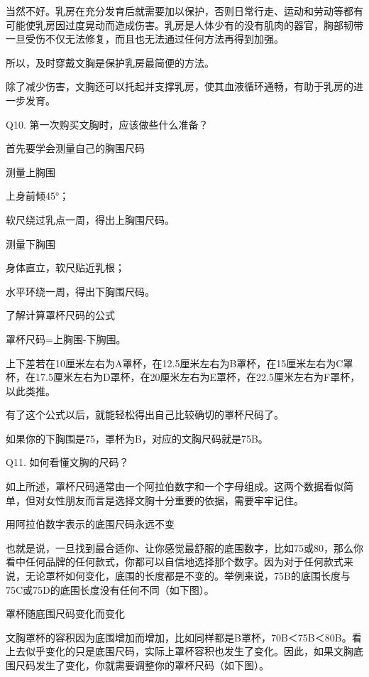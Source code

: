 \documentclass[12pt,UTF8]{ctexbook}
\begin{document}
当然不好。乳房在充分发育后就需要加以保护，否则日常行走、运动和劳动等都有可能使乳房因过度晃动而造成伤害。乳房是人体少有的没有肌肉的器官，胸部韧带一旦受伤不仅无法修复，而且也无法通过任何方法再得到加强。

所以，及时穿戴文胸是保护乳房最简便的方法。

除了减少伤害，文胸还可以托起并支撑乳房，使其血液循环通畅，有助于乳房的进一步发育。





Q10. 第一次购买文胸时，应该做些什么准备？


首先要学会测量自己的胸围尺码


测量上胸围

上身前倾45°；

软尺绕过乳点一周，得出上胸围尺码。


测量下胸围

身体直立，软尺贴近乳根；

水平环绕一周，得出下胸围尺码。

了解计算罩杯尺码的公式

罩杯尺码=上胸围-下胸围。

上下差若在10厘米左右为A罩杯，在12.5厘米左右为B罩杯，在15厘米左右为C罩杯，在17.5厘米左右为D罩杯，在20厘米左右为E罩杯，在22.5厘米左右为F罩杯，以此类推。

有了这个公式以后，就能轻松得出自己比较确切的罩杯尺码了。

如果你的下胸围是75，罩杯为B，对应的文胸尺码就是75B。





Q11. 如何看懂文胸的尺码？


如上所述，罩杯尺码通常由一个阿拉伯数字和一个字母组成。这两个数据看似简单，但对女性朋友而言是选择文胸十分重要的依据，需要牢牢记住。

用阿拉伯数字表示的底围尺码永远不变

也就是说，一旦找到最合适你、让你感觉最舒服的底围数字，比如75或80，那么你看中任何品牌的任何款式，你都可以自信地选择那个数字。因为对于任何款式来说，无论罩杯如何变化，底围的长度都是不变的。举例来说，75B的底围长度与75C或75D的底围长度没有任何不同（如下图）。



罩杯随底围尺码变化而变化

文胸罩杯的容积因为底围增加而增加，比如同样都是B罩杯，70B＜75B＜80B。看上去似乎变化的只是底围尺码，实际上罩杯容积也发生了变化。因此，如果文胸底围尺码发生了变化，你就需要调整你的罩杯尺码（如下图）。
\end{document}
